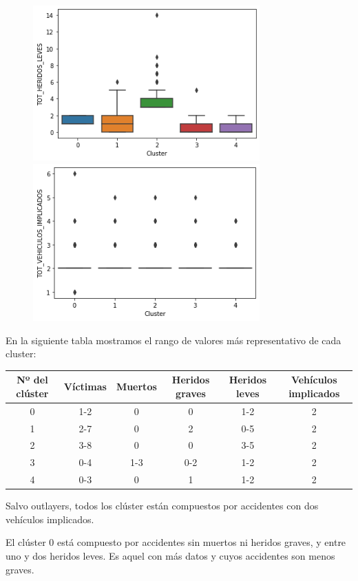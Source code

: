 \documentclass[a4]{article}
\begin{document}
\begin{figure}[H]
  \includegraphics[width=87mm]{imagenes/c1_kmeans_bp_hl}
  \includegraphics[width=87mm]{imagenes/c1_kmeans_bp_vi}
\end{figure}

\newpage
En la siguiente tabla mostramos el rango de valores más representativo de cada cluster:

\begin{center}
\begin{tabular}{|c|c|c|c|c|c|}
\hline
\multicolumn{1}{|c|}{\textbf{Nº del clúster}} & \textbf{Víctimas} & \textbf{Muertos} & \textbf{Heridos graves} & \textbf{Heridos leves} & \textbf{Vehículos implicados}\\ \hline
  0  & 1-2 & 0   & 0   & 1-2 & 2 \\ \hline
  1  & 2-7 & 0   & 2   & 0-5 & 2 \\ \hline
  2  & 3-8 & 0   & 0   & 3-5 & 2 \\ \hline
  3  & 0-4 & 1-3 & 0-2 & 1-2 & 2 \\ \hline
  4  & 0-3 & 0   & 1   & 1-2 & 2 \\ \hline
\end{tabular}
\end{center}

Salvo outlayers, todos los clúster están compuestos por accidentes con dos vehículos implicados.

El clúster $0$ está compuesto por accidentes sin muertos ni heridos graves, y entre uno y dos heridos leves. Es aquel con más datos y cuyos accidentes son menos graves.
\end{document}
